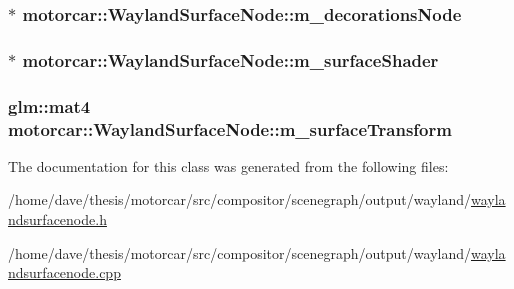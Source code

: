 \hypertarget{classmotorcar_1_1WaylandSurfaceNode_a72f5c39ec90685228602edfb9bd48e43}{
\subsubsection[{m\-\_\-decorations\-Node}]{$\ast$ motorcar\-::\-Wayland\-Surface\-Node\-::m\-\_\-decorations\-Node\hspace{0.3cm}{\ttfamily [protected]}}}\label{classmotorcar_1_1WaylandSurfaceNode_a72f5c39ec90685228602edfb9bd48e43}
\hypertarget{classmotorcar_1_1WaylandSurfaceNode_a78d92f66eb62093d34bde0aa4304c028}{
\subsubsection[{m\-\_\-surface\-Shader}]{$\ast$ motorcar\-::\-Wayland\-Surface\-Node\-::m\-\_\-surface\-Shader\hspace{0.3cm}{\ttfamily [protected]}}}\label{classmotorcar_1_1WaylandSurfaceNode_a78d92f66eb62093d34bde0aa4304c028}
\hypertarget{classmotorcar_1_1WaylandSurfaceNode_a70da528843079f3bf566086bc4688ad4}{
\subsubsection[{m\-\_\-surface\-Transform}]{\setlength{\rightskip}{0pt plus 5cm}glm\-::mat4 motorcar\-::\-Wayland\-Surface\-Node\-::m\-\_\-surface\-Transform\hspace{0.3cm}{\ttfamily [protected]}}}\label{classmotorcar_1_1WaylandSurfaceNode_a70da528843079f3bf566086bc4688ad4}


The documentation for this class was generated from the following files\-:\begin{DoxyCompactItemize}
\item 
/home/dave/thesis/motorcar/src/compositor/scenegraph/output/wayland/\hyperlink{waylandsurfacenode_8h}{waylandsurfacenode.\-h}\item 
/home/dave/thesis/motorcar/src/compositor/scenegraph/output/wayland/\hyperlink{waylandsurfacenode_8cpp}{waylandsurfacenode.\-cpp}\end{DoxyCompactItemize}
